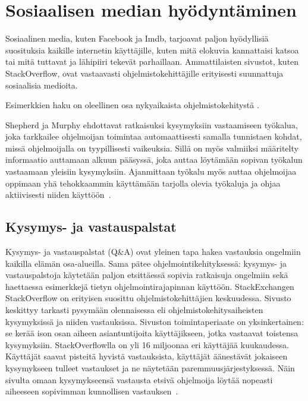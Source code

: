 \documentclass[finnish]{tktltiki2}
\theoremstyle{definition}
\theoremstyle{remark}
\begin{document}
\section{Sosiaalisen median hyödyntäminen}
Sosiaalinen media, kuten Facebook ja Imdb, tarjoavat paljon hyödyllisiä suosituksia kaikille internetin käyttäjille, kuten mitä elokuvia kannattaisi katsoa tai mitä tuttavat ja lähipiiri tekevät parhaillaan. Ammattilaisten sivustot, kuten StackOverflow, ovat vastaavasti ohjelmistokehittäjille erityisesti suunnattuja sosiaalisia medioita.

Esimerkkien haku on oleellinen osa nykyaikaista ohjelmistokehitystä \cite{example-overflow-social-media-for-code-recommendations}.


Shepherd ja Murphy ehdottavat ratkaisuksi kysymyksiin vastaamiseen työkalua, joka tarkkailee ohjelmoijan toimintaa automaattisesti samalla tunnistaen kohdat, missä ohjelmoijalla on tyypillisesti vaikeuksia. Sillä on myös valmiiksi määritelty informaatio auttamaan alkuun pääsyssä, joka auttaa löytämään sopivan työkalun vastaamaan yleisiin kysymyksiin. Ajanmittaan työkalu myös auttaa ohjelmoijaa oppimaan yhä tehokkaammin käyttämään tarjolla olevia työkaluja ja ohjaa aktiivisesti niiden käyttöön~\cite{programmers-coach}.

\subsection{Kysymys- ja vastauspalstat}
Kysymys- ja vastauspalstat (Q\&A) ovat yleinen tapa hakea vastauksia ongelmiin kaikilla elämän osa-alueilla. Sama pätee ohjelmointikehityksessä: kysymys- ja vastauspalstoja käytetään paljon etsittäessä sopivia ratkaisuja ongelmiin sekä haettaessa esimerkkejä tietyn ohjelmointirajapinnan käyttöön. StackExchangen StackOverflow on erityisen suosittu ohjelmistokehittäjien keskuudessa. Sivusto keskittyy tarkasti pysymään olennaisessa eli ohjelmistokehitysaiheisten kysymyksissä ja niiden vastauksissa. Sivuston toimintaperiaate on yksinkertainen: se kerää ison osan aiheen asiantuntijoita käyttäjikseen, jotka vastaavat toistensa kysymyksiin. StackOverflowlla on yli 16 miljoonaa eri käyttäjää kuukaudessa. Käyttäjät saavat pisteitä hyvistä vastauksista, käyttäjät äänestävät jokaiseen kysymykseen tulleet vastaukset ja ne näytetään paremmuusjärjestyksessä. Näin sivulta omaan kysymykseensä vastausta etsivä ohjelmoija löytää nopeasti aiheeseen sopivimman kunnollisen vastauksen~\cite{social-networking-meets-se}.
\end{document}
